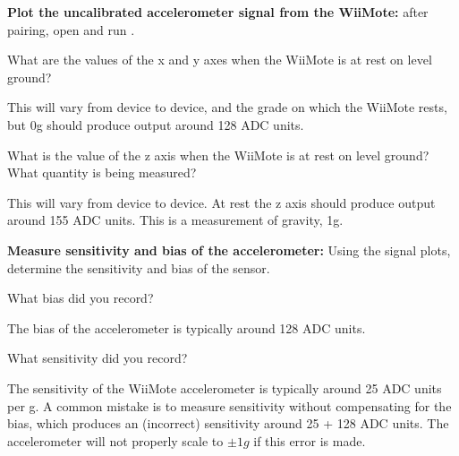 \begin{asparaenum}
\item \textbf{Plot the uncalibrated accelerometer signal from the WiiMote:} after pairing, open and run .

    \begin{compactenum}
    \item What are the values of the x and y axes when the WiiMote is at rest on level ground?
        \begin{solution}
        This will vary from device to device, and the grade on which the WiiMote rests, but 0g should produce output around 128 ADC units.
        \end{solution}

    \item What is the value of the z axis when the WiiMote is at rest on level ground? What quantity is being measured?
        \begin{solution}
        This will vary from device to device. At rest the z axis should produce output around 155 ADC units. This is a measurement of gravity, 1g.
        \end{solution}
    \end{compactenum}

\item \textbf{Measure sensitivity and bias of the accelerometer:} Using the signal plots, determine the sensitivity and bias of the sensor.


    \begin{compactenum}
    \item What bias did you record?
        \begin{solution}
        The bias of the accelerometer is typically around 128 ADC units.
        \end{solution}

    \item What sensitivity did you record?
        \begin{solution}
        The sensitivity of the WiiMote accelerometer is typically around 25 ADC units per g. A common mistake is to measure sensitivity without compensating for the bias, which produces an (incorrect) sensitivity around 25 + 128 ADC units. The accelerometer will not properly scale to $\pm 1g$ if this error is made.
        \end{solution}
    \end{compactenum}


\end{asparaenum}
